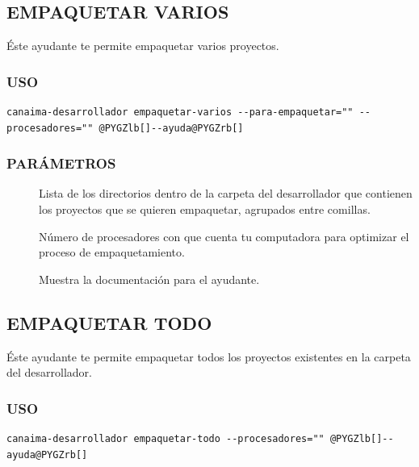 \documentclass[letterpaper,12pt,spanish]{manual}
\begin{document}
\subsection{\textbf{EMPAQUETAR VARIOS}}

Éste ayudante te permite empaquetar varios proyectos.


\subsubsection{USO}

\begin{Verbatim}[commandchars=@\[\]]
canaima-desarrollador empaquetar-varios --para-empaquetar="" --procesadores="" @PYGZlb[]--ayuda@PYGZrb[]
\end{Verbatim}


\subsubsection{PARÁMETROS}
\begin{description}
\item[{}] \leavevmode
Lista de los directorios dentro de la carpeta del desarrollador que contienen los proyectos que se quieren empaquetar, agrupados entre comillas.

\item[{}] \leavevmode
Número de procesadores con que cuenta tu computadora para optimizar el proceso de empaquetamiento.

\item[{}] \leavevmode
Muestra la documentación para el ayudante.

\end{description}


\subsection{\textbf{EMPAQUETAR TODO}}

Éste ayudante te permite empaquetar todos los proyectos existentes en la carpeta del desarrollador.


\subsubsection{USO}

\begin{Verbatim}[commandchars=@\[\]]
canaima-desarrollador empaquetar-todo --procesadores="" @PYGZlb[]--ayuda@PYGZrb[]
\end{Verbatim}
\end{document}
